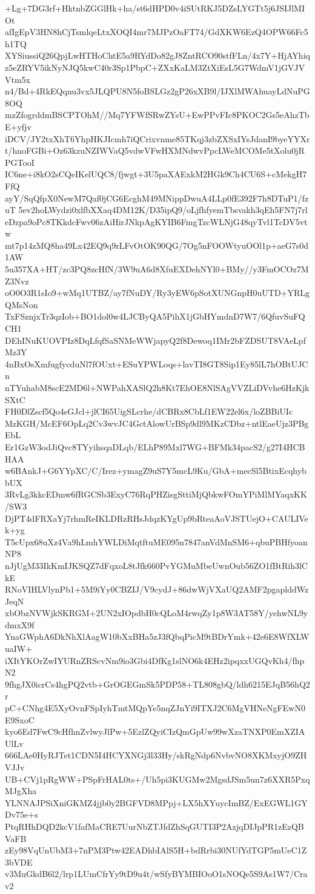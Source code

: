 +Lg+7DG3rf+HktnbZGGlHk+ha/st6dHPD0v4iSUtRKJ5DZsLYGTt5j6JSIJlMIOt
afIgEpV3HN8hCjTsmlqeLtxXOQI4mr7MJPzOaFT74/GdXKW6EzQ4OPW66Fc5h1TQ
XYSiussiQ26QpjLwHTHoChtE5a9RYdDo82gJ8ZntRCO90stfFLn/4x7Y+HjAYhiq
z5eZRYV5ikNyNJQ5kwC40r3Sp1PbpC+ZXxKaLM3ZtXiEsL5G7WdmV1jGVJVVtm5x
n4/Bd+4RkEQqnu3vx5JLQPU8N5foBSLGz2gP26xXB9l/IJXlMWAhuayLdNuPG8OQ
mzZfogrddmBSCPTOhM//Mq7YFWfSRwZYsU+EwPPvFIc8PKOC2Gs5eAhzTbE+yfjv
iDCV/JY2txXhT6YhpHKJIcmh7iQCrixvnme85TKqj3zbZXSxIYsJdanI9byeYYXr
t/hnoFGBi+Oz63kzuNZIWVaQ5vdwVFwHXMNdwvPpcLWeMCOMe5tXolu0jRPGTooI
IC6ne+i8kO2sCQeIKelUQC8/fjwgt+3U5paXAExkM2HGk9Ch4CU6S+cMekgH7FfQ
ayY/SqQfpX0NewM7Qaf0jCG6EcghM49MNippDwuA4LLp0fE392F7h8DTuP1/fzuT
5ev2hoLWydzi0xlfbXXaq4DM12K/D35ipQ9/oLjfhfyemTbsvakh3qEh5FN7j7rl
eDzpa9oPc8TKkdcFwv06zAiHirJNkpAgKYIB6FmgTzcWLNjG48qyTvl1TcDV5vtw
mt7p14zMQ8ha49Lx42EQ9q9rLFvOtOK90QG/7Og5nFOOWtyuOOl1p+aeG7s0d1AW
5u357XA+HT/zc3PQ8zcHfN/3W9uA6d8XfuEXDehNYl0+BMy//y3FmOCOz7MZ3Nvz
oO0O3R1sIo9+wMq1UTBZ/ay7fNuDY/Ry3yEW6pSotXUNGnpH0uUTD+YRLgQMsNon
TxFSznjxTr3qzIob+BO1dol0w4LJCByQA5PihX1jGbHYmdnD7W7/6QfuvSuFQCH1
DEhINuKUOVPIz8DqLfqfSaSNMeWWjapyQ2f8Dewoq1IMr2bFZDSUT8VAeLpfMz3Y
4nBxOsXmfugfycduNl7fOUxt+ESuYPWLoqs+lavTI8GT8Sip1Ey85lL7hOBtUJCn
nTYuhabM8scE2MD6l+NWPahXASlQ2h8Kt7EhOE8NlSAgVVZLiDVvhe6HzKjkSXtC
FH0DlZscf5Qo4sGJcl+jlCI65UigSLcrhe/dCBRx8CbLf1EW22el6x/loZBBiUIc
MzKGH/McEF6OpLq2Cv3wvJC4GctAlowUrBSp9dl9MKzCDbz+ntlEaeUjz3PBgEbL
Er1GzW3odJiQvc8TYyihsqaDLqb/ELhP89Mxl7WG+BFMk34pacS2/g27I4HCBHAA
w6BAnkJ+G6YYpXC/C/Irez+ymagZ9uS7Y5mcL9Ku/GbA+mecSl5BtixEcqhybbUX
3RvLg3kkcEDmw6fRGCSb3ExyC76RqPHZisgSttiMjQbkwFOmYPiMlMYaqxKK/SW3
DjPT4dFRXaYj7rhmReIKLDRzRHsJdqzKYgUp9bRteaAoVJSTUejO+CAULIVek+yg
T5cUpx68uXz4Va9hLmhYWLDiMqtftuME095n7847anVdMnSM6+qbuPBHfyoanNP8
nJjUgM33IkKmIJKSQZ7dFqxoL8tJfk660PvYGMuMbeUwnOub56ZO1fBtRih3lCkE
RNoVIHLVlynPb1+5M9iYy0CBZIJ/V9cydJ+86dwWjVXaUQ2AMF2pgaplddWzJeqN
xbObzNVWjkSKRGM+2UN2xIOpdbH0cQLoM4rwqZy1p8W3AT58Y/yehwNL9ydmxX9f
YnaGWphA6DkNhXlAagW10bXxBHa5zJ3fQbqPicM9tBDrYmk+42e6E8WfXLWuaIW+
iXItYKOrZwIYURnZRScvNm9io3Gbi4DfKg1slNO6k4EHz2ipqxxUGQvKh4/fhpN2
9fhgJX0icrCs4hgPQ2vtb+GrOGEGmSk5PDP58+TL808gbQ/ldh6215EJqB56hQ2r
pC+CNhg4E5XyOvnFSpIyhTmtMQpYe5nqZJnYi9ITXJ2C6MgVHNeNgFEwN0E9SxoC
kyo6Ed7FwC9cHfhnZvlwyJlPw+5EzlZQyiCIzQmGpUw99wXzaTNXP0EmXZIAUlLv
666LAe0HyRJTet1CDN5I4HCYXNGj3l33Hy/skRgNdp6NvbvNO8XKMxyjO9ZHVJJv
UB+CVj1pRgWW+PSpFrHAL0ts+/Uh5pi3KUGMw2MgsdJSm5un7z6XXR5PxqMJgXha
YLNNAJPSiXniGKMZ4jjb0y2BGFVD8MPpj+LX5hXYuycImBZ/ExEGWL1GYDv75e+s
PtqRHhDQD2kcV1fafMaCRE7UurNbZTJfdZhSqGUTI3P2AzjqDIJpPR1zEzQBVaFB
zEy98VqUnUbM3+7nPM3Ptw42EADhbIAlS5H+bdRrbi30NUfYdTGP5mUeC1Z3bVDE
v3MuGkdB6l2/lrp1LUmCfrYy9tD9u4t/wSfyBYMBIOoO1sNOQe5S9As1W7/Crav2
